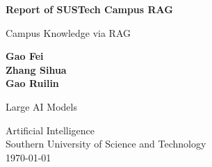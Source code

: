 \begin{titlepage}
    \begin{center}
        \vspace*{1cm}
        
        \Huge
        \textbf{Report of SUSTech Campus RAG}
        
        \vspace{0.5cm}
        \LARGE
        Campus Knowledge via RAG %
        
        \vspace{1.5cm}
        
        \textbf{Gao Fei\\Zhang Sihua\\Gao Ruilin}
   		  \vspace{1.5cm}
        
        \textbf{}
       
        \vfill
        
        Large AI Models
        
        \vspace{0.8cm}
          \Large
        Artificial Intelligence\\
        Southern University of Science and Technology\\
       \today
        
    \end{center}
\end{titlepage}
